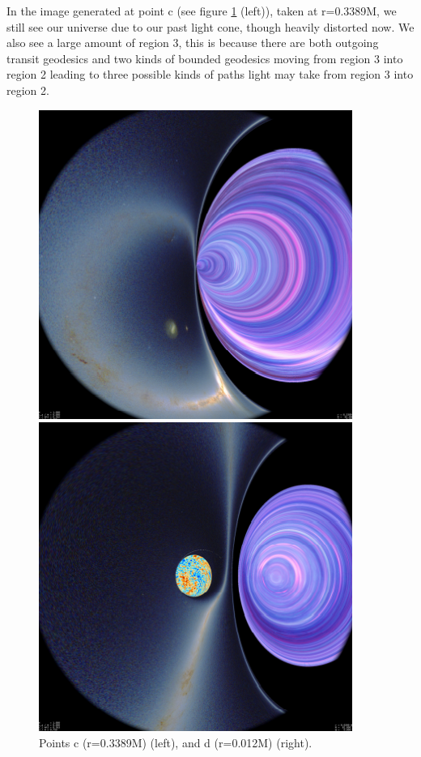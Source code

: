 \documentclass[oneside,openright,frontopenright, singlespacing]{dmathesis}
\begin{document}
\vspace{1em}
	In the image generated at point c (see figure \ref{fig:Figure6.5} (left)), taken at r=0.3389M, we still see our universe due to our past light cone, though heavily distorted now. We also see a large amount of region 3, this is because there are both outgoing transit geodesics and two kinds of bounded geodesics moving from region 3 into region 2 leading to three possible kinds of paths light may take from region 3 into region 2.

\vspace{1em}
\begin{figure}[!ht]
	\centering
	\begin{minipage}{0.5\textwidth}
		\centering
		\includegraphics[width=0.75\linewidth]{img/plunging3}
	\end{minipage}%
	\hfill
	\begin{minipage}{0.5\textwidth}
		\centering
		\includegraphics[width=0.75\linewidth]{img/plunging4}
	\end{minipage}
	\caption{Points c (r=0.3389M) (left), and d (r=0.012M) (right).}
	\label{fig:Figure6.5}
\end{figure}
\end{document}
